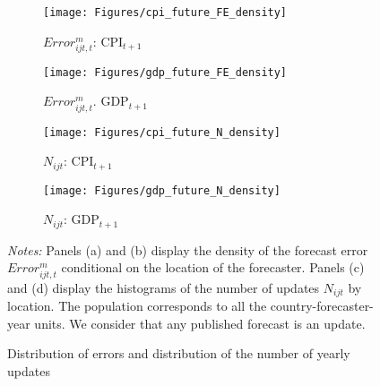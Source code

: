 \newpage
\begin{figure}[h]
	
		\begin{subfigure}[b]{0.48\textwidth}
		\centering
		\texttt{[image: Figures/cpi\_future\_FE\_density]}
		\caption{$Error_{ijt,t}^m$: $\text{CPI}_{t+1}$ }
		\label{fig:error_density_cpi_f}
	\end{subfigure}
	\hfill
	\begin{subfigure}[b]{0.48\textwidth}
		\centering
		\texttt{[image: Figures/gdp\_future\_FE\_density]}
		\caption{$Error_{ijt,t}^m$. $\text{GDP}_{t+1}$ }
		\label{fig:error_density_gdp_f}
	\end{subfigure}
	
	\begin{subfigure}[b]{0.48\textwidth}
		\centering
		\texttt{[image: Figures/cpi\_future\_N\_density]}
		\caption{$N_{ijt}$: $\text{CPI}_{t+1}$ }
		\label{fig:cpi_future_N_density}
	\end{subfigure}
	\hfill
	\begin{subfigure}[b]{0.48\textwidth}
		\centering
		\texttt{[image: Figures/gdp\_future\_N\_density]}
		\caption{$N_{ijt}$: $\text{GDP}_{t+1}$}
		\label{fig:gdp_future_N_density}
	\end{subfigure}
	
	\caption{Distribution of errors and distribution of the number of yearly updates}
	\label{fig:error_update_future}
	\begin{fignote}
		\textit{Notes:} Panels (a) and (b) display the density of the forecast error $Error_{ijt,t}^m$ conditional on the location of the forecaster. Panels (c) and (d) display the histograms of the number of updates $N_{ijt}$ by location. The population corresponds to all the country-forecaster-year units. We consider that any published forecast is an update.
	\end{fignote}
\end{figure}

{
 
}

{
 
}
